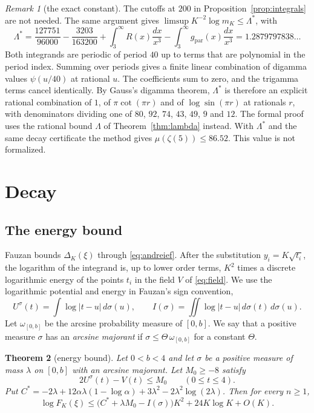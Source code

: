 \documentclass[11pt]{amsart}
\newtheorem{theorem}{Theorem}[section]
\theoremstyle{definition}
\theoremstyle{remark}
\newtheorem{remark}[theorem]{Remark}
\numberwithin{equation}{section}
\newcommand{\gref}{g_{\mathrm{par}}}
\begin{document}
\begin{remark}[the exact constant]\label{rem:exact}
The cutoffs at $200$ in Proposition~\ref{prop:integrals} are not needed. The same argument gives
$\limsup K^{-2}\log m_K\le\Lambda^*$, with
\[
 \Lambda^*=\frac{127751}{96000}-\frac{3203}{163200}+\int_3^\infty R(x)\frac{dx}{x^3}-\int_3^\infty\gref(x)\frac{dx}{x^3}
 =1.2879797838\ldots
\]
Both integrands are periodic of period $40$ up to terms that are polynomial in the period index. Summing over periods
gives a finite linear combination of digamma values $\psi(u/40)$ at rational $u$. The coefficients sum to zero, and
the trigamma terms cancel identically. By Gauss's digamma theorem, $\Lambda^*$ is therefore an explicit rational
combination of $1$, of $\pi\cot(\pi r)$ and of $\log\sin(\pi r)$ at rationals $r$, with denominators dividing one of
$80$, $92$, $74$, $43$, $49$, $9$ and $12$. The formal proof uses the rational bound $\Lambda$ of Theorem~\ref{thm:lambda} instead. With
$\Lambda^*$ and the same decay certificate the method gives $\mu(\zeta(5))\le86.52$. This value is not formalized.
\end{remark}

\section{Decay}\label{sec:decay}

\subsection{The energy bound}
Fauzan bounds $\Delta_K(\xi)$ through \eqref{eq:andreief}. After the substitution $y_i=K\sqrt{t_i}$, the logarithm of
the integrand is, up to lower order terms, $K^2$ times a discrete logarithmic energy of the points $t_i$ in the field
$V$ of \eqref{eq:field}. We use the logarithmic potential and energy in Fauzan's sign convention,
\[
 U^\sigma(t)=\int\log|t-u|\,d\sigma(u),\qquad I(\sigma)=\iint\log|t-u|\,d\sigma(t)\,d\sigma(u).
\]
Let $\omega_{[0,b]}$ be the arcsine probability measure of $[0,b]$. We say that a positive measure $\sigma$ has an
\emph{arcsine majorant} if $\sigma\le\Theta\,\omega_{[0,b]}$ for a constant $\Theta$.

\begin{theorem}[energy bound]\label{thm:energy}
Let $0<b<4$ and let $\sigma$ be a positive measure of mass $\lambda$ on $[0,b]$ with an arcsine majorant. Let
$M_0\ge-8$ satisfy
\begin{equation}\label{eq:cellhyp}
 2U^\sigma(t)-V(t)\le M_0\qquad(0\le t\le4).
\end{equation}
Put $C^*=-2\lambda+12\alpha\lambda(1-\log\alpha)+3\lambda^2-2\lambda^2\log(2\lambda)$. Then for every $n\ge1$,
\[
 \log F_K(\xi)\le\bigl(C^*+\lambda M_0-I(\sigma)\bigr)K^2+24K\log K+O(K).
\]
\end{theorem}
\end{document}
